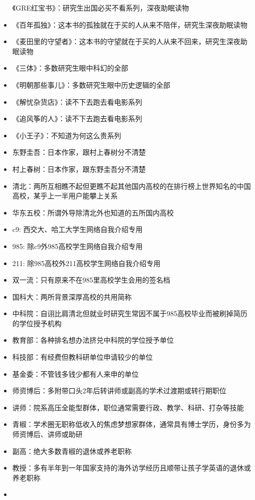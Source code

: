 \documentclass[]{tufte-book}
\begin{document}
\begin{itemize}
  《GRE红宝书》：研究生出国必买不看系列，深夜助眠读物
\item
  《百年孤独》：这本书的孤独就在于买的人从来不陪伴，研究生深夜助眠读物
\item
  《麦田里的守望者》：这本书的守望就在于买的人从来不回来，研究生深夜助眠读物
\item
  《三体》：多数研究生眼中科幻的全部
\item
  《明朝那些事儿》：多数研究生眼中历史逻辑的全部
\item
  《解忧杂货店》：读不下去跑去看电影系列
\item
  《追风筝的人》：读不下去跑去看电影系列
\item
  《小王子》：不知道为何这么贵系列
\item
  东野圭吾：日本作家，跟村上春树分不清楚
\item
  村上春树：日本作家，跟东野圭吾分不清楚
\item
  清北：两所互相瞧不起但更瞧不起其他国内高校的在排行榜上世界知名的中国高校，某乎上一半用户能攀上关系
\item
  华东五校：所谓外导除清北外也知道的五所国内高校
\item
  c9: 西交大、哈工大学生网络自我介绍专用
\item
  985: 除c9外985高校学生网络自我介绍专用
\item
  211: 除985高校外211高校学生网络自我介绍专用
\item
  双一流：只有原来不在985里高校学生会用的签名档
\item
  国科大：两所背景深厚高校的共用简称
\item
  中科院：自诩比肩清北但就业时研究生常因不属于985高校毕业而被刷掉简历的学位授予机构
\item
  教育部：各种排名想办法挤兑中科院的学位授予单位
\item
  科技部：有经费但教科研单位申请较少的单位
\item
  基金委：不管钱多钱少都有人来申的单位
\item
  师资博后：多附带口头2年后转讲师或副高的学术过渡期或转行期职位
\item
  讲师：院系高压全能型群体，职位通常需要行政、教学、科研、打杂等技能
\item
  青椒：学术圈无职称低收入的焦虑梦想家群体，通常具有博士学历，身份多为师资博后、讲师或助研
\item
  副高：绝大多数青椒的退休或养老职称
\item
  教授：多有半年到一年国家支持的海外访学经历且顺带让孩子学英语的退休或养老职称
\item

\end{itemize}
\end{document}
